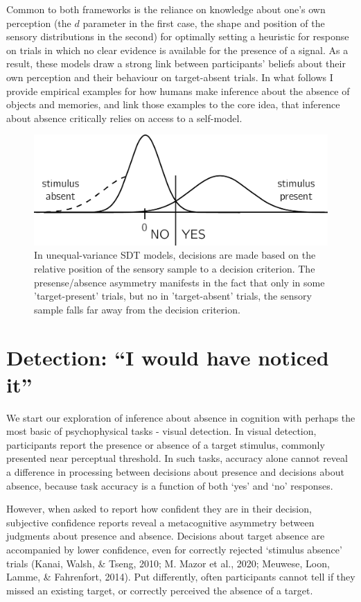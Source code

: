 \documentclass[12pt,twoside]{reedthesis}
\begin{document}
Common to both frameworks is the reliance on knowledge about one's own perception (the \(d\) parameter in the first case, the shape and position of the sensory distributions in the second) for optimally setting a heuristic for response on trials in which no clear evidence is available for the presence of a signal. As a result, these models draw a strong link between participants' beliefs about their own perception and their behaviour on target-absent trials. In what follows I provide empirical examples for how humans make inference about the absence of objects and memories, and link those examples to the core idea, that inference about absence critically relies on access to a self-model.
\begin{figure}
\includegraphics[width=0.7\linewidth]{figure/intro/sdt} \caption{In unequal-variance SDT models, decisions are made based on the relative position of the sensory sample to a decision  criterion. The presense/absence asymmetry manifests in the fact that only in some 'target-present' trials, but no in 'target-absent' trials, the sensory sample falls far away from the decision criterion.}\label{fig:intro-sdt}
\end{figure}
\hypertarget{detection-i-would-have-noticed-it}{%
\section{Detection: ``I would have noticed it''}\label{detection-i-would-have-noticed-it}}

We start our exploration of inference about absence in cognition with perhaps the most basic of psychophysical tasks - visual detection. In visual detection, participants report the presence or absence of a target stimulus, commonly presented near perceptual threshold. In such tasks, accuracy alone cannot reveal a difference in processing between decisions about presence and decisions about absence, because task accuracy is a function of both `yes' and `no' responses.

However, when asked to report how confident they are in their decision, subjective confidence reports reveal a metacognitive asymmetry between judgments about presence and absence. Decisions about target absence are accompanied by lower confidence, even for correctly rejected `stimulus absence' trials (Kanai, Walsh, \& Tseng, 2010; M. Mazor et al., 2020; Meuwese, Loon, Lamme, \& Fahrenfort, 2014). Put differently, often participants cannot tell if they missed an existing target, or correctly perceived the absence of a target.
\end{document}
